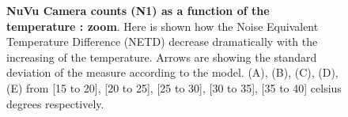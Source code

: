 \begin{figure}[htbp]
\begin{center}
\qquad

\caption{{\bf NuVu Camera counts (N1) as a function of the temperature : zoom}. Here is shown how the Noise Equivalent Temperature Difference (NETD) decrease dramatically with the increasing of the temperature. Arrows are showing the standard deviation of the measure according to the model. (A), (B), (C), (D), (E)  from [15 to 20], [20 to 25], [25 to 30], [30 to 35], [35 to 40] celsius degrees respectively. }
\label{fig:BBRtheo2}
\end{center}
\end{figure}


